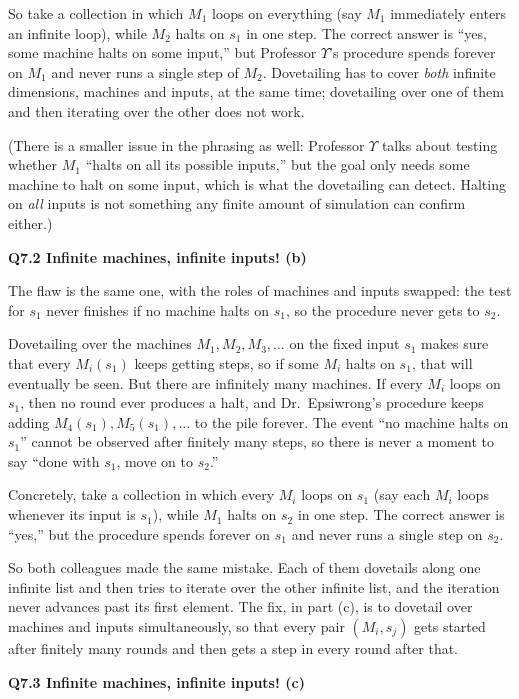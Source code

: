 \documentclass[11pt]{article}
\newcommand{\qpage}[1]{\clearpage\noindent\textbf{\large #1}\par\medskip}
\begin{document}
So take a collection in which $M_1$ loops on everything (say $M_1$ immediately enters an infinite loop), while $M_2$ halts on $s_1$ in one step.
The correct answer is ``yes, some machine halts on some input,'' but Professor $\Upsilon$'s procedure spends forever on $M_1$ and never runs a single step of $M_2$.
Dovetailing has to cover \emph{both} infinite dimensions, machines and inputs, at the same time; dovetailing over one of them and then iterating over the other does not work.

(There is a smaller issue in the phrasing as well: Professor $\Upsilon$ talks about testing whether $M_1$ ``halts on all its possible inputs,'' but the goal only needs some machine to halt on some input, which is what the dovetailing can detect.
Halting on \emph{all} inputs is not something any finite amount of simulation can confirm either.)

\qpage{Q7.2 Infinite machines, infinite inputs! (b)}

The flaw is the same one, with the roles of machines and inputs swapped: the test for $s_1$ never finishes if no machine halts on $s_1$, so the procedure never gets to $s_2$.

Dovetailing over the machines $M_1, M_2, M_3, \ldots$ on the fixed input $s_1$ makes sure that every $M_i(s_1)$ keeps getting steps, so if some $M_i$ halts on $s_1$, that will eventually be seen.
But there are infinitely many machines.
If every $M_i$ loops on $s_1$, then no round ever produces a halt, and Dr.\ Epsiwrong's procedure keeps adding $M_4(s_1), M_5(s_1), \ldots$ to the pile forever.
The event ``no machine halts on $s_1$'' cannot be observed after finitely many steps, so there is never a moment to say ``done with $s_1$, move on to $s_2$.''

Concretely, take a collection in which every $M_i$ loops on $s_1$ (say each $M_i$ loops whenever its input is $s_1$), while $M_1$ halts on $s_2$ in one step.
The correct answer is ``yes,'' but the procedure spends forever on $s_1$ and never runs a single step on $s_2$.

So both colleagues made the same mistake.
Each of them dovetails along one infinite list and then tries to iterate over the other infinite list, and the iteration never advances past its first element.
The fix, in part (c), is to dovetail over machines and inputs simultaneously, so that every pair $(M_i, s_j)$ gets started after finitely many rounds and then gets a step in every round after that.

\qpage{Q7.3 Infinite machines, infinite inputs! (c)}
\end{document}
